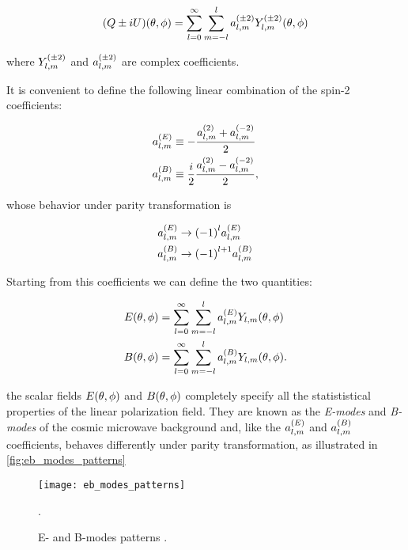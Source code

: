 \begin{equation}
        (Q \pm iU)\qty(\theta,\phi) = \sum^\infty_{l=0}\sum^l_{m=-l}
        a^{\qty(\pm 2)}_{l,m} Y^{\qty(\pm 2)}_{l,m}\qty(\theta,\phi)
\end{equation}

where $Y^{\qty(\pm 2)}_{l,m}$ and $a^{\qty(\pm 2)}_{l,m}$ are complex
coefficients.

It is convenient to define the following linear combination of the spin-2
coefficients:

\begin{align}
        a^{\qty(E)}_{l,m} & \equiv -\frac{a^{\qty(2)}_{l,m} + a^{\qty(-2)}_{l,m}}
        {2} \\
        a^{\qty(B)}_{l,m} & \equiv \frac{i}{2}
        \frac{a^{\qty(2)}_{l,m} - a^{\qty(-2)}_{l,m}}{2},
\end{align}

whose behavior under parity transformation is

\begin{align}
        a^{\qty(E)}_{l,m} & \rightarrow \qty(-1)^l a^{\qty(E)}_{l,m} \\
        a^{\qty(B)}_{l,m} & \rightarrow \qty(-1)^{l + 1} a^{\qty(B)}_{l,m}
\end{align}

Starting from this coefficients we can define the two quantities:

\begin{align}
        E\qty(\theta,\phi) & = \sum^\infty_{l=0}\sum^l_{m=-l}
        a^{\qty(E)}_{l,m} Y_{l,m}\qty(\theta,\phi) \\
        B\qty(\theta,\phi) & = \sum^\infty_{l=0}\sum^l_{m=-l}
        a^{\qty(B)}_{l,m} Y_{l,m}\qty(\theta,\phi).
\end{align}

the scalar fields $E\qty(\theta,\phi)$ and $B\qty(\theta,\phi)$ completely
specify all the statististical properties of the linear polarization
field. They are known as the \emph{E-modes} and \emph{B-modes} of the
cosmic microwave background and, like the $a^{\qty(E)}_{l,m}$ and
$a^{\qty(B)}_{l,m}$ coefficients, behaves differently under parity
transformation, as illustrated in \autoref{fig:eb_modes_patterns}

\begin{figure}
        \centering
        \texttt{[image: eb\_modes\_patterns]}
        \caption{E- and B-modes patterns \autocite{hu1997cmb}.}
        \label{fig:eb_modes_patterns}.
\end{figure}

